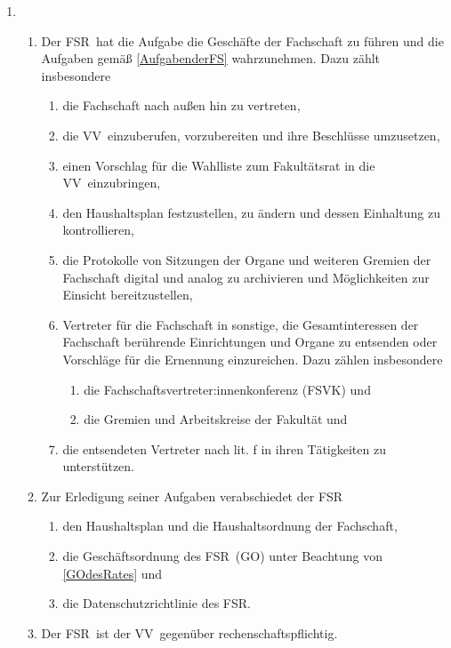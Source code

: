 \documentclass[a4paper, 12pt]{article}
\newcommand{\vv}{VV}
\newcommand{\rat}{FSR}
\newcommand{\rates}{FSR}
\begin{document}
\begin{enumerate}[leftmargin=0cm]
	\item {}
	\begin{enumerate}[leftmargin=0cm]
		\item Der \rat~hat die Aufgabe die Geschäfte der Fachschaft zu führen und die Aufgaben gemäß \ref{AufgabenderFS} wahrzunehmen. Dazu zählt insbesondere
		\begin{enumerate}[leftmargin=0.5cm]
			\item die Fachschaft nach außen hin zu vertreten,
			\item die \vv~einzuberufen, vorzubereiten und ihre Beschlüsse umzusetzen,
			\item einen Vorschlag für die Wahlliste zum Fakultätsrat in die \vv~einzubringen,
			\item den Haushaltsplan festzustellen, zu ändern und dessen Einhaltung zu kontrollieren, 
			\item die Protokolle von Sitzungen der Organe und weiteren Gremien der Fachschaft digital und analog zu archivieren und Möglichkeiten zur Einsicht bereitzustellen,
			\item Vertreter für die Fachschaft in sonstige, die Gesamtinteressen der Fachschaft berührende Einrichtungen und Organe zu entsenden oder Vorschläge für die Ernennung einzureichen. Dazu zählen insbesondere\label{VertreterDerFS}
			\begin{enumerate}[leftmargin=0.75cm]
				\item die Fachschaftsvertreter:innenkonferenz (FSVK) und
				\item die Gremien und Arbeitskreise der Fakultät und
			\end{enumerate}
			\item die entsendeten Vertreter nach lit. f in ihren Tätigkeiten zu unterstützen.
		\end{enumerate}
		\item Zur Erledigung seiner Aufgaben verabschiedet der \rat
		\begin{enumerate}[leftmargin=0.5cm]
			\item den Haushaltsplan und die Haushaltsordnung der Fachschaft,
			\item die Geschäftsordnung des \rates~(GO) unter Beachtung von \ref{GOdesRates} und
			\item die Datenschutzrichtlinie des \rates.
		\end{enumerate}
		\item Der \rat~ist der \vv~gegenüber rechenschaftspflichtig.
	\end{enumerate}


\end{enumerate}
\end{document}
